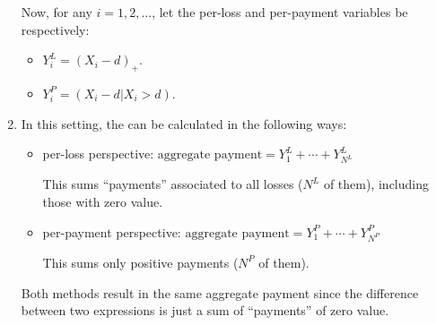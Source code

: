 \begin{enumerate}
Now, for any \(i=1,2,\dotsc\), let the per-loss and per-payment variables be
respectively:
\begin{itemize}
\item \(Y^L_i=(X_i-d)_{+}\).
\item \(Y^P_i=(X_i-d|X_i>d)\).
\end{itemize}

\item \label{it:agg-pmt-fmlas}
In this setting, the  can be calculated in the
following ways:
\begin{itemize}
\item per-loss perspective: \(\text{aggregate payment}=\boxed{Y_1^L+\dotsb+Y_{N^L}^L}\)
\begin{note}
This sums ``payments'' associated to all losses (\(N^L\) of them), including those
with zero value.
\end{note}
\item per-payment perspective: \(\text{aggregate payment}=\boxed{Y_1^P+\dotsb+Y_{N^P}^P}\)
\begin{note}
This sums only positive payments (\(N^P\) of them).
\end{note}
\end{itemize}
Both methods result in the same aggregate payment since the difference between
two expressions is just a sum of ``payments'' of zero value.
\end{enumerate}
